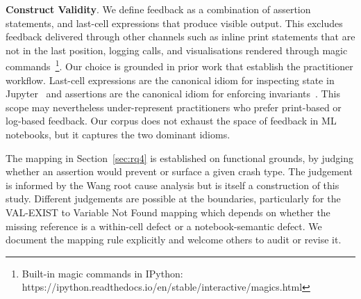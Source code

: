 \documentclass[a4paper,USenglish,cleveref,autoref,thm-restate,anonymous]{lipics-v2021}       %
\begin{document}

\textbf{Construct Validity}.
We define feedback
as a combination of assertion statements,
and last-cell expressions that produce visible output.
This excludes feedback delivered through other channels
such as inline print statements that are not in the last position,
logging calls,
and visualisations rendered through magic commands~\footnote{Built-in
magic commands in IPython: https://ipython.readthedocs.io/en/stable/interactive/magics.html}.
Our choice is grounded in prior work that establish the practitioner workflow.
Last-cell expressions are the canonical idiom for inspecting state in Jupyter~\cite{kery2018story,head2019managing}
and assertions are the canonical idiom for enforcing invariants~\cite{kochhar2017revisiting}.
This scope may nevertheless under-represent practitioners
who prefer print-based or log-based feedback.
Our corpus does not exhaust the space of feedback in ML notebooks,
but it captures the two dominant idioms.

The mapping in Section~\ref{sec:rq4}
is established on functional grounds,
by judging whether an assertion would prevent
or surface a given crash type.
The judgement is informed by the Wang root cause analysis
but is itself a construction of this study.
Different judgements are possible at the boundaries,
particularly for the VAL-EXIST to Variable Not Found mapping
which depends on whether the missing reference is a within-cell defect
or a notebook-semantic defect.
We document the mapping rule explicitly
and welcome others to audit or revise it.

\end{document}
